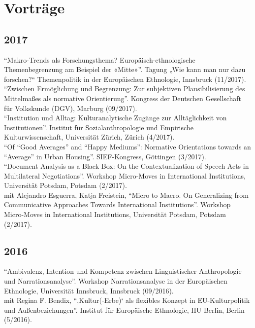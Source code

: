 \documentclass[11pt, a4paper]{article} %
\begin{document}
\section*{Vorträge}
\subsection*{2017}
\enquote{Makro-Trends als Forschungsthema? Europäisch-ethnologische Themenbegrenzung am Beispiel der «Mitte»}. Tagung „Wie kann man nur dazu forschen?“ Themenpolitik in der Europäischen Ethnologie, Innsbruck (11/2017).\\[.25cm]
\enquote{Zwischen Ermöglichung und Begrenzung: Zur subjektiven Plausibilisierung des Mittelmaßes als normative Orientierung}. Kongress der Deutschen Gesellschaft für Volkskunde (DGV), Marburg (09/2017).\\[.25cm]
\enquote{Institution und Alltag: Kulturanalytische Zugänge zur Alltäglichkeit von Institutionen}. Institut für Sozialanthropologie und Empirische Kulturwissenschaft, Universität Zürich, Zürich (4/2017).\\[.25cm]
\enquote{Of “Good Averages” and “Happy Mediums”: Normative Orientations towards an “Average” in Urban Housing}. SIEF-Kongress, Göttingen (3/2017).\\[.25cm]
\enquote{Document Analysis as a Black Box: On the Contextualization of Speech Acts in Multilateral Negotiations}. Workshop Micro-Moves in International Institutions, Universität Potsdam, Potsdam (2/2017).\\[.25cm]
mit Alejandro Esguerra, Katja Freistein, \enquote{Micro to Macro. On Generalizing from Communicative Approaches Towards International Institutions}. Workshop Micro-Moves in International Institutions, Universität Potsdam, Potsdam (2/2017).
\subsection*{2016}
\enquote{Ambivalenz, Intention und Kompetenz zwischen Linguistischer Anthropologie und Narrationsanalyse}. Workshop Narrationsanalyse in der Europäischen Ethnologie, Universität Innsbruck, Innsbruck (09/2016).\\[.25cm]
mit Regina F. Bendix, \enquote{,Kultur(-Erbe)‘ als flexibles Konzept in EU-Kulturpolitik und Außenbeziehungen}. Institut für Europäische Ethnologie, HU Berlin, Berlin (5/2016).
\end{document}
